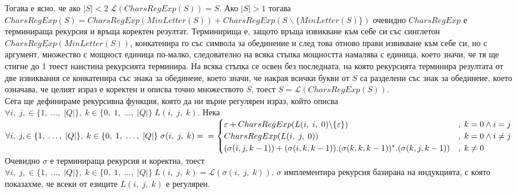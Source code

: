 \documentclass[a4paper, 12pt, oneside]{article}
\newcommand{\Lang}{\mathcal{L}}
\begin{document}
Тогава е ясно, че ако $|S| < 2 \; \Lang(CharsRegExp(S)) = S$. Ако $|S| > 1$ тогава
$CharsRegExp(S) = CharsRegExp(MinLetter(S)) + CharsRegExp(S\backslash\{MinLetter(S)\})$
очевидно $CharsRegExp$ е терминираща рекурсия и връща коректен резултат. Терминирища е,
защото връща извикване към себе си със синглетон \\
$CharsRegExp(MinLetter(S))$,
конкатенира го със символа за обединение и след това отново прави извикване към себе си,
но с аргумент, множество с мощност единица по-малко, следователно на всяка стъпка
мощността намалява с единица, което значи, че тя ще стигне до 1 тоест наистина рекурсията
терминира. На всяка стъпка се освен без последната, на която рекурсията терминира
резултата от две извиквания се конкатенира със знака за обединеие, което значи, че
накрая всички букви от $S$ са разделени със знак за обединеие, което означава, че
целият израз е коректен и описва точно множеството $S$, тоест $S = \Lang(CharsRegExp(S))$. \\

Сега ще дефинираме рекурсивна функция, която да ни върне регулярен израз, който описва \\

$\forall i, \; j, \in \{1, \; \dots, \; |Q|\}, \; k \in \{0, \; 1, \; \dots, \; |Q|\} \; L(i, \; j, \; k)$. Нека \\

$\forall i, \; j, \in \{1, \; \dots, \; |Q|\}, \; k \in \{0, \; 1, \; \dots, \; |Q|\} \; \sigma(i, \; j, \; k) =  \\\\
= \begin{cases}
    \varepsilon + CharsRegExp(L(i, \; i, \; 0) \backslash \{\varepsilon\}) & , \; k = 0 \land i = j \\
    CharsRegExp(L(i, \; j, \; 0)) & , \; k = 0 \land i \neq j \\
    (\sigma(i, j, k - 1)) + (\sigma(i, k, k - 1)).(\sigma(k, k, k - 1))^*
    .(\sigma(k, j, k - 1)) & , \; k \neq 0
\end{cases}$ \\

Очевидно $\sigma$ е терминираща рекурсия и коректна, тоест \\
$\forall i, \; j, \in \{1, \; \dots, \; |Q|\}, \; k \in \{0, \; 1, \; \dots, \; |Q|\} \; L(i, \; j, \; k) = \Lang(\sigma(i, \; j, \; k))$.
$\sigma$ имплементира рекурсия базирана на индукцията, с която показахме, че всеки от езиците $L(i, \; j, \; k)$ е регулярен. \\
\end{document}
